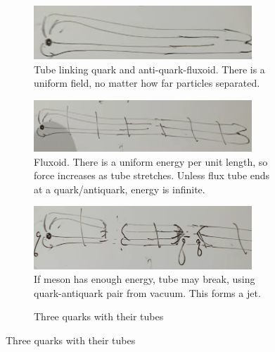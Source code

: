 \documentclass[]{article}
\begin{document}
\begin{figure}[H]
	\begin{subfigure}[t]{0.45\textwidth}
		\caption{Tube linking quark and anti-quark-fluxoid. There is a uniform field, no matter how far particles separated.}
		\includegraphics[width=0.9\textwidth]{2-4-quark-gluon-field-tubes-QAQ}
	\end{subfigure}
	\hfill
	\begin{subfigure}[t]{0.45\textwidth}
		\caption{Fluxoid. There is a uniform energy per unit length, so force increases as tube stretches. Unless flux tube ends at a quark/antiquark, energy is infinite.}
		\includegraphics[width=0.9\textwidth]{2-4-quark-gluon-field-tube-uniform-energy}
	\end{subfigure}
	\begin{subfigure}[t]{0.45\textwidth}
		\caption{If meson has enough energy, tube may break, using quark-antiquark pair from vacuum. This forms a jet.}
		\includegraphics[width=0.9\textwidth]{2-4-split-meson}
	\end{subfigure}
	\hfill
	\begin{subfigure}[t]{0.45\textwidth}
		\caption{Three quarks with their tubes}

\end{subfigure}
\end{figure}
\end{document}
